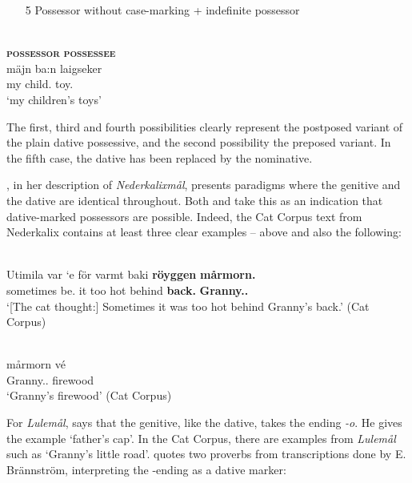 \begin{enumerate}
\item[5] Possessor without case-marking + indefinite possessor
\end{enumerate}


\ea\label{}
\\
\glll \textbf{\textsc{possessor}} \textbf{\textsc{possessee}}\\
mäjn  ba:n  laigseker\\
my  child.{\pl}  toy.{\pl}\\
\glt ‘my children’s toys’
\z

The first, third and fourth possibilities clearly represent the postposed variant of the plain dative possessive, and the second possibility the preposed variant. In the fifth case, the dative has been replaced by the nominative.  

\citet{Rutberg1924}, in her description of \textit{Nederkalixmål}, presents paradigms where the genitive and the dative are identical throughout. Both \citet[161]{Källskog1992} and \citet[42]{Delsing2003a} take this as an indication that dative-marked possessors are possible. Indeed, the Cat Corpus text from Nederkalix contains at least three clear examples –  above and also the following:

\renewcommand{\eachwordone}{\itshape} 
\renewcommand{\eachwordtwo}{\upshape}  

\ea\label{}
\\
\gll Utimila  var  ‘e  för  varmt  baki  \textbf{röyggen} \textbf{mårmorn.}\\
sometimes  be.{\pst}  it  too  hot  behind  \textbf{back.{}} \textbf{Granny.{}.{\dat}}\\
\glt ‘[The cat thought:] Sometimes it was too hot behind Granny’s back.’ (Cat Corpus)
\z

\ea\label{}
\\
\gll mårmorn  vé\\
Granny.{}.{\dat}  firewood\\
\glt ‘Granny’s firewood’  (Cat Corpus)
\z

For \textit{Lulemål}, \citet{Nordström1925} says that the genitive, like the dative, takes the ending\textit{ {}-o}. He gives the example  ‘father’s cap’. In the Cat Corpus, there are examples from \textit{Lulemål} such as  ‘Granny’s little road’.  \citet[163]{Källskog1992} quotes two proverbs from transcriptions done by E. Brännström, interpreting the -ending as a dative marker: 


